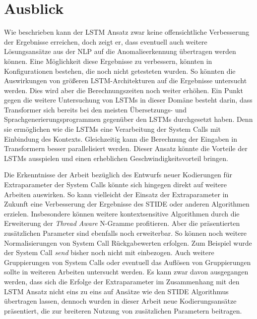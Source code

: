 \section{Ausblick}
Wie beschrieben kann der \ac{LSTM} Ansatz zwar keine offensichtliche Verbesserung der Ergebnisse erreichen, doch zeigt er, dass eventuell auch weitere Lösungsansätze aus der \ac{NLP} auf die Anomalieerkennung übertragen werden können.
Eine Möglichkeit diese Ergebnisse zu verbessern, könnten in Konfigurationen bestehen, die noch nicht getesteten wurden.
So könnten die Auswirkungen von größeren \ac{LSTM}-Architekturen auf die Ergebnisse untersucht werden.
Dies wird aber die Berechnungszeiten noch weiter erhöhen.
Ein Punkt gegen die weitere Untersuchung von \acp{LSTM} in dieser Domäne besteht darin, dass Transformer sich bereits bei den meisten Übersetzungs-  und Sprachgenerierungsprogrammen  gegenüber den \acp{LSTM} durchgesetzt haben. 
Denn sie ermöglichen wie die \acp{LSTM} eine Verarbeitung der System Calls mit Einbindung des Kontexts.
Gleichzeitig kann die Berechnung der Eingaben in Transformern besser parallelisiert werden.
Dieser Ansatz könnte die Vorteile der \acp{LSTM} ausspielen und einen erheblichen Geschwindigkeitsvorteil bringen.\par\medskip

Die Erkenntnisse der Arbeit bezüglich des Entwurfs neuer Kodierungen für Extraparameter der System Calls könnte sich hingegen direkt auf weitere Arbeiten auswirken.
So kann vielleicht der Einsatz der Extraparameter in Zukunft eine Verbesserung der Ergebnisse des \ac{STIDE} oder anderen Algorithmen erzielen.
Insbesondere können weitere kontextsensitive Algorithmen durch die Erweiterung der \textit{Thread Aware} N-Gramme profitieren. 
Aber die präsentierten zusätzlichen Parameter sind ebenfalls noch erweiterbar.
So können noch weitere Normalisierungen von System Call Rückgabewerten erfolgen.
Zum Beispiel wurde der System Call \textit{send} bisher noch nicht mit einbezogen.
Auch weitere Gruppierungen von System Calls oder eventuell das Auflösen von Gruppierungen sollte in weiteren Arbeiten untersucht werden.
Es kann zwar davon ausgegangen werden, dass sich die Erfolge der Extraparameter im Zusammenhang mit den \ac{LSTM} Ansatz nicht eins zu eins auf Ansätze wie den \ac{STIDE} Algorithmus übertragen lassen, dennoch wurden in dieser Arbeit neue Kodierungsansätze präsentiert, die zur breiteren Nutzung von zusätzlichen Parametern beitragen.

